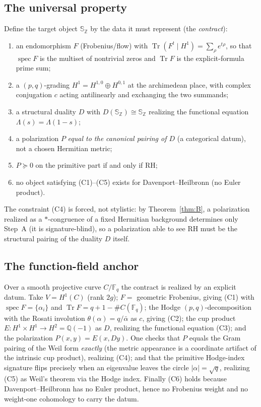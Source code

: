 \documentclass[11pt,reqno]{amsart}
\theoremstyle{plain}
\theoremstyle{definition}
\theoremstyle{remark}
\newcommand{\Q}{\mathbb{Q}}
\newcommand{\Z}{\mathbb{Z}}
\newcommand{\F}{\mathbb{F}}
\newcommand{\Sph}{\mathbb{S}}
\newcommand{\spec}{\operatorname{spec}}
\newcommand{\Tr}{\operatorname{Tr}}
\begin{document}
\subsection{The universal property}
Define the target object $\Sph_\Z$ by the data it must represent (the \emph{contract}):
\begin{enumerate}
\item[(C1)] an endomorphism $F$ (Frobenius/flow) with $\Tr(F^t\mid H^1)=\sum_\rho e^{t\rho}$, so that
$\spec F$ is the multiset of nontrivial zeros and $\Tr F$ is the explicit-formula prime sum;
\item[(C2)] a $(p,q)$-grading $H^1=H^{1,0}\oplus H^{0,1}$ at the archimedean place, with complex conjugation
$c$ acting antilinearly and exchanging the two summands;
\item[(C3)] a structural duality $D$ with $D(\Sph_\Z)\cong\Sph_\Z$ realizing the functional equation
$\Lambda(s)=\Lambda(1-s)$;
\item[(C4)] a polarization $P$ \emph{equal to the canonical pairing of $D$} (a categorical datum), not a
chosen Hermitian metric;
\item[(C5)] $P\succeq0$ on the primitive part if and only if RH;
\item[(C6)] no object satisfying (C1)--(C5) exists for Davenport--Heilbronn (no Euler product).
\end{enumerate}
The constraint (C4) is forced, not stylistic: by Theorem~\ref{thm:B}, a polarization realized as a
$*$-congruence of a fixed Hermitian background determines only Step~A (it is signature-blind), so a
polarization able to see RH must be the structural pairing of the duality $D$ itself.

\subsection{The function-field anchor}
Over a smooth projective curve $C/\F_q$ the contract is realized by an explicit datum. Take $V=H^1(C)$ (rank
$2g$); $F=$ geometric Frobenius, giving (C1) with $\spec F=\{\alpha_i\}$ and $\Tr F=q+1-\#C(\F_q)$; the Hodge
$(p,q)$-decomposition with the Rosati involution $\theta(\alpha)=q/\bar\alpha$ as $c$, giving (C2); the cup
product $E\colon H^1\times H^1\to H^2=\Q(-1)$ as $D$, realizing the functional equation (C3); and the
polarization $P(x,y)=E(x,Dy)$. One checks that $P$ equals the Gram pairing of the Weil form \emph{exactly}
(the metric appearance is a coordinate artifact of the intrinsic cup product), realizing (C4); and that the
primitive Hodge-index signature flips precisely when an eigenvalue leaves the circle $|\alpha|=\sqrt q$,
realizing (C5) as Weil's theorem via the Hodge index. Finally (C6) holds because Davenport--Heilbronn has no
Euler product, hence no Frobenius weight and no weight-one cohomology to carry the datum.
\end{document}
